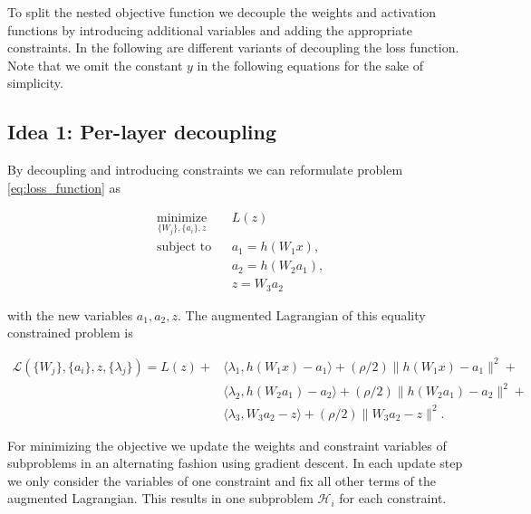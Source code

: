 \documentclass[english,11pt,a4paper]{article}
\newcommand\inner[2]{\langle #1, #2 \rangle}
\begin{document}
To split the nested objective function we decouple the weights and activation functions
by introducing additional variables and adding the appropriate constraints. In the following are different variants of decoupling the loss function. Note that we omit the constant $y$ in the following equations for the sake of simplicity.

\subsection{Idea 1: Per-layer decoupling}

By decoupling and introducing constraints we can reformulate problem \ref{eq:loss_function} as

\begin{equation}
	\begin{aligned}
		& \underset{\{W_j\},\{a_i\},z}{\text{minimize}}
		&& L(z) \\
		& \text{subject to}
		&&  a_1 = h(W_1x), \\
		&&& a_2 = h(W_2a_1), \\
		&&& z = W_3a_2
	\end{aligned}
\end{equation}

with the new variables $a_1, a_2, z$. The augmented Lagrangian of this equality constrained problem is

\begin{equation}
	\begin{aligned}
		\mathcal{L}(\{W_j\}, \{a_i\}, z, \{\lambda_j\}) = L(z) + 
		& \inner{\lambda_1}{h(W_1x)-a_1} + (\rho/2) \| h(W_1x)-a_1 \|^2 + \\
		& \inner{\lambda_2}{h(W_2a_1)-a_2} + (\rho/2) \| h(W_2a_1)-a_2 \|^2 + \\
		& \inner{\lambda_3}{W_3a_2-z} + (\rho/2) \| W_3a_2-z \|^2.
	\end{aligned}
\end{equation}

For minimizing the objective we update the weights and constraint variables of subproblems in an alternating fashion using gradient descent. In each update step we only consider the variables of one constraint and fix all other terms of the augmented Lagrangian. This results in one subproblem $\mathcal{H}_i$ for each constraint.
\end{document}
